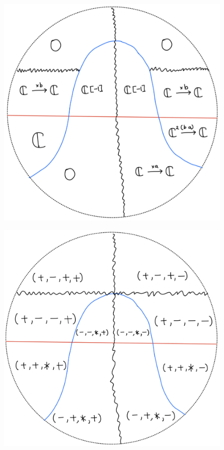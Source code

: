 \begin{figure}[H]
    \centering
    \includegraphics[scale = 0.45]{diagrams/cobord'2/31.png} 
    \caption{}
    \label{fig:your-label}
\end{figure}
\begin{figure}[H]
    \centering
    \includegraphics[scale = 0.45]{diagrams/cobord'2/32.png} 
    \caption{}
    \label{fig:your-label}
\end{figure}
